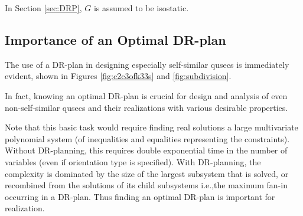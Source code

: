 





\noindent
\note In Section \ref{sec:DRP}, $G$ is assumed to be isostatic.


\subsection{Importance of an Optimal DR-plan}
The use of a DR-plan in designing especially self-similar qusecs is
immediately evident, shown in Figures \ref{fig:c2c3ofk33s} and
\ref{fig:subdivision}.

In fact, knowing an optimal DR-plan is crucial for
design and analysis of even non-self-similar qusecs and their
realizations with various desirable properties.

Note that this basic task
would require finding real solutions a large multivariate polynomial
system (of inequalities and equalities representing the constraints).
Without DR-planning, this requires double exponential time in the
number of variables (even if orientation type is specified). With
DR-planning, the complexity is dominated by the size of the largest
subsystem that is solved, or recombined from the solutions of its
child subsystems i.e.,the maximum fan-in occurring in a DR-plan. Thus
finding an optimal DR-plan is important for realization.

